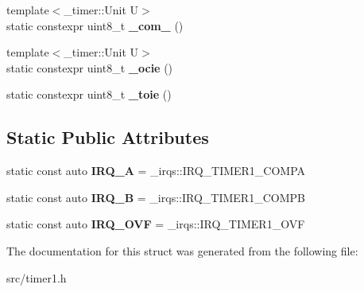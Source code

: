 \begin{DoxyCompactItemize}
{\footnotesize template$<$\+\_\+timer\+::\+Unit U$>$ }\\static constexpr uint8\+\_\+t {\bfseries \+\_\+com\+\_} ()
\item 
\hypertarget{struct__timer1_1_1TimerDef_a6504dd40640fb7ab7999227fbf03a789}{}\label{struct__timer1_1_1TimerDef_a6504dd40640fb7ab7999227fbf03a789} 
{\footnotesize template$<$\+\_\+timer\+::\+Unit U$>$ }\\static constexpr uint8\+\_\+t {\bfseries \+\_\+ocie} ()
\item 
\hypertarget{struct__timer1_1_1TimerDef_ae7a6b40362c9cc350a4a614c50616936}{}\label{struct__timer1_1_1TimerDef_ae7a6b40362c9cc350a4a614c50616936} 
static constexpr uint8\+\_\+t {\bfseries \+\_\+toie} ()
\end{DoxyCompactItemize}
\subsection*{Static Public Attributes}
\begin{DoxyCompactItemize}
\item 
\hypertarget{struct__timer1_1_1TimerDef_a027dfdb642b38869b98e5430bc9ee36a}{}\label{struct__timer1_1_1TimerDef_a027dfdb642b38869b98e5430bc9ee36a} 
static const auto {\bfseries I\+R\+Q\+\_\+A} = \+\_\+irqs\+::\+I\+R\+Q\+\_\+\+T\+I\+M\+E\+R1\+\_\+\+C\+O\+M\+PA
\item 
\hypertarget{struct__timer1_1_1TimerDef_ac72126667749d7df7fa83837b87c4fce}{}\label{struct__timer1_1_1TimerDef_ac72126667749d7df7fa83837b87c4fce} 
static const auto {\bfseries I\+R\+Q\+\_\+B} = \+\_\+irqs\+::\+I\+R\+Q\+\_\+\+T\+I\+M\+E\+R1\+\_\+\+C\+O\+M\+PB
\item 
\hypertarget{struct__timer1_1_1TimerDef_ab673f10cb12fc4bd91de978b837fe2b8}{}\label{struct__timer1_1_1TimerDef_ab673f10cb12fc4bd91de978b837fe2b8} 
static const auto {\bfseries I\+R\+Q\+\_\+\+O\+VF} = \+\_\+irqs\+::\+I\+R\+Q\+\_\+\+T\+I\+M\+E\+R1\+\_\+\+O\+VF
\end{DoxyCompactItemize}


The documentation for this struct was generated from the following file\+:\begin{DoxyCompactItemize}
\item 
src/timer1.\+h\end{DoxyCompactItemize}
